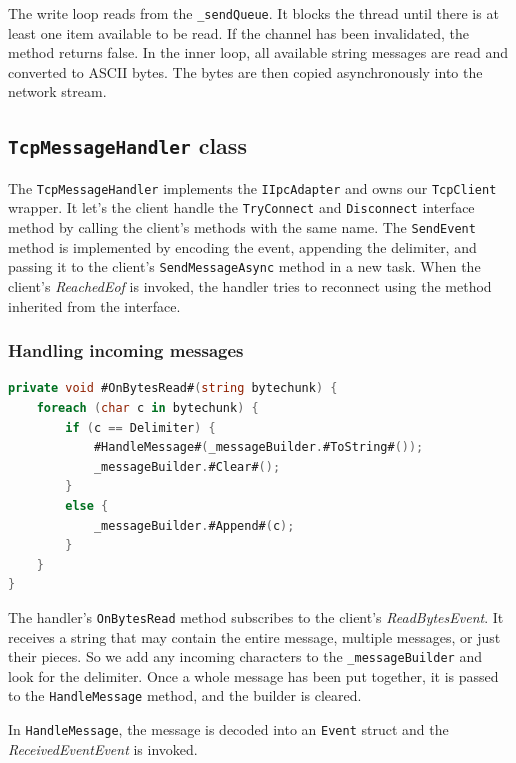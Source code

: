 The write loop reads from the \texttt{\_sendQueue}. It blocks the thread until there is at least one item available to be read. If the channel has been invalidated, the method returns false. In the inner loop, all available string messages are read and converted to ASCII bytes. The bytes are then copied asynchronously into the network stream.

\subsection{\texttt{TcpMessageHandler} class}

The \texttt{TcpMessageHandler} implements the \texttt{IIpcAdapter} and owns our \texttt{TcpClient} wrapper. It let's the client handle the \texttt{TryConnect} and \texttt{Disconnect} interface method by calling the client's methods with the same name. The \texttt{SendEvent} method is implemented by encoding the event, appending the delimiter, and passing it to the client's \texttt{SendMessageAsync} method in a new task. When the client's \textit{ReachedEof} is invoked, the handler tries to reconnect using the method inherited from the interface.

\subsubsection{Handling incoming messages}

\begin{lstlisting}[language=csharp, caption={\texttt{TcpClient.OnBytesRead} method}]
private void #OnBytesRead#(string bytechunk) {
    foreach (char c in bytechunk) {
        if (c == Delimiter) {
            #HandleMessage#(_messageBuilder.#ToString#());
            _messageBuilder.#Clear#();
        }
        else {
            _messageBuilder.#Append#(c);
        }
    }
}
\end{lstlisting}

The handler's \texttt{OnBytesRead} method subscribes to the client's \textit{ReadBytesEvent}. It receives a string that may contain the entire message, multiple messages, or just their pieces. So we add any incoming characters to the \texttt{\_messageBuilder} and look for the delimiter. Once a whole message has been put together, it is passed to the \texttt{HandleMessage} method, and the builder is cleared.

In \texttt{HandleMessage}, the message is decoded into an \texttt{Event} struct and the \textit{ReceivedEventEvent} is invoked.


